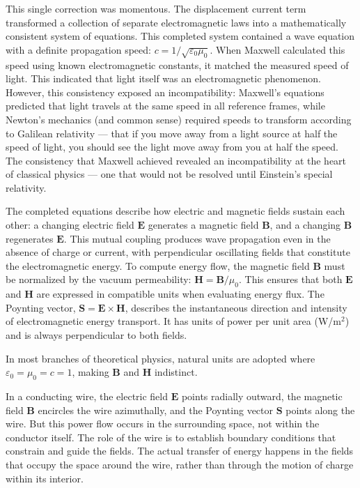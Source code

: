 This single correction was momentous. The displacement current term transformed a collection of separate electromagnetic laws into a mathematically consistent system of equations. This completed system contained a wave equation with a definite propagation speed: $c = 1/\sqrt{\varepsilon_0 \mu_0}$. When Maxwell calculated this speed using known electromagnetic constants, it matched the measured speed of light. This indicated that light itself was an electromagnetic phenomenon. However, this consistency exposed an incompatibility: Maxwell's equations predicted that light travels at the same speed in all reference frames, while Newton's mechanics (and common sense) required speeds to transform according to Galilean relativity — that if you move away from a light source at half the speed of light, you should see the light move away from you at half the speed. The consistency that Maxwell achieved revealed an incompatibility at the heart of classical physics — one that would not be resolved until Einstein's special relativity.

The completed equations describe how electric and magnetic fields sustain each other: a changing electric field $\mathbf{E}$ generates a magnetic field $\mathbf{B}$, and a changing $\mathbf{B}$ regenerates $\mathbf{E}$. This mutual coupling produces wave propagation even in the absence of charge or current, with perpendicular oscillating fields that constitute the electromagnetic energy. To compute energy flow, the magnetic field $\mathbf{B}$ must be normalized by the vacuum permeability: $\mathbf{H} = \mathbf{B} / \mu_0$. This ensures that both $\mathbf{E}$ and $\mathbf{H}$ are expressed in compatible units when evaluating energy flux. The Poynting vector, $\mathbf{S} = \mathbf{E} \times \mathbf{H}$, describes the instantaneous direction and intensity of electromagnetic energy transport. It has units of power per unit area (W/m$^2$) and is always perpendicular to both fields.

In most branches of theoretical physics, natural units are adopted where $\varepsilon_0 = \mu_0 = c = 1$, making $\mathbf{B}$ and $\mathbf{H}$ indistinct.

In a conducting wire, the electric field $\mathbf{E}$ points radially outward, the magnetic field $\mathbf{B}$ encircles the wire azimuthally, and the Poynting vector $\mathbf{S}$ points along the wire. But this power flow occurs in the surrounding space, not within the conductor itself. The role of the wire is to establish boundary conditions that constrain and guide the fields. The actual transfer of energy happens in the fields that occupy the space around the wire, rather than through the motion of charge within its interior.

